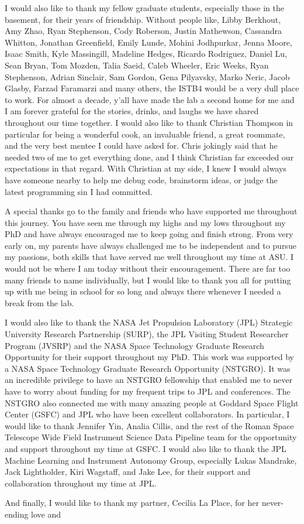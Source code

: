 I would also like to thank my fellow graduate students, especially those in the basement, for their years of friendship.
Without people like, Libby Berkhout, Amy Zhao, Ryan Stephenson, Cody Roberson, Justin Mathewson, Cassandra Whitton, Jonathan Greenfield, Emily Lunde, Mohini Jodhpurkar, Jenna Moore, Isaac Smith, Kyle Massingill, Madeline Hedges, Ricardo Rodriguez, Daniel Lu, Sean Bryan, Tom Mozden, Talia Saeid, Caleb Wheeler, Eric Weeks, Ryan Stephenson, Adrian Sinclair, Sam Gordon, Gena Pilyavsky, Marko Neric, Jacob Glasby, Farzad Faramarzi and many others, the ISTB4 would be a very dull place to work. 
For almost a decade, y'all have made the lab a second home for me and I am forever grateful for the stories, drinks, and laughs we have shared throughout our time together.
I would also like to thank Christian Thompson in particular for being a wonderful cook, an invaluable friend, a great roommate, and the very best mentee I could have asked for.
Chris jokingly said that he needed two of me to get everything done, and I think Christian far exceeded our expectations in that regard.
With Christian at my side, I knew I would always have someone nearby to help me debug code, brainstorm ideas, or judge the latest programming sin I had committed.

A special thanks go to the family and friends who have supported me throughout this journey. 
You have seen me through my highs and my lows throughout my PhD and have always encouraged me to keep going and finish strong.
From very early on, my parents have always challenged me to be independent and to pursue my passions, both skills that have served me well throughout my time at ASU.
I would not be where I am today without their encouragement.
There are far too many friends to name individually, but I would like to thank you all for putting up with me being in school for so long and always there whenever I needed a break from the lab.

I would also like to thank the NASA Jet Propulsion Laboratory (JPL) Strategic University Research Partnership (SURP), the JPL Visiting Student Researcher Program (JVSRP) and the NASA Space Technology Graduate Research Opportunity for their support throughout my PhD. 
This work was supported by a NASA Space Technology Graduate Research Opportunity (NSTGRO). 
It was an incredible privilege to have an NSTGRO fellowship that enabled me to never have to worry about funding for my frequent trips to JPL and conferences.
The NSTGRO also connected me with many amazing people at Goddard Space Flight Center (GSFC) and JPL who have been excellent collaborators.
In particular, I would like to thank Jennifer Yin, Analia Cillis, and the rest of the Roman Space Telescope Wide Field Instrument Science Data Pipeline team for the opportunity and support throughout my time at GSFC.
I would also like to thank the JPL Machine Learning and Instrument Autonomy Group, especially Lukas Mandrake, Jack Lightholder, Kiri Wagstaff, and Jake Lee, for their support and collaboration throughout my time at JPL.

And finally, I would like to thank my partner, Cecilia La Place, for her never-ending love and 
